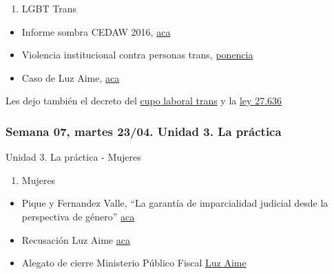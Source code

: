\documentclass[
]{article}
\providecommand{\tightlist}{%
  \setlength{\itemsep}{0pt}\setlength{\parskip}{0pt}}
\begin{document}
\begin{enumerate}
\def\labelenumi{\alph{enumi}.}
\setcounter{enumi}{3}
\tightlist
\item
  LGBT Trans
\end{enumerate}

\begin{itemize}
\item
  Informe sombra CEDAW 2016,
  \href{https://drive.google.com/file/d/1Zv0TtTTzgt5N4vSBEo3F7UjiayBQ2BIx/view?usp=sharing}{aca}
\item
  Violencia institucional contra personas trans,
  \href{https://drive.google.com/file/d/1NWDuVTHVpSSWbHTuvP6WPAy6waXvDyXo/view}{ponencia}
\item
  Caso de Luz Aime,
  \href{http://cosecharoja.org/absolvieron-a-luz-aime/}{aca}
\end{itemize}

Les dejo también el decreto del
\href{http://servicios.infoleg.gob.ar/infolegInternet/anexos/340000-344999/341808/norma.htm}{cupo
laboral trans} y la
\href{http://servicios.infoleg.gob.ar/infolegInternet/anexos/350000-354999/351815/norma.htm}{ley
27.636}

\hypertarget{semana-07-martes-2304.-unidad-3.-la-pruxe1ctica}{%
\subsubsection{Semana 07, martes 23/04. Unidad 3. La
práctica}\label{semana-07-martes-2304.-unidad-3.-la-pruxe1ctica}}

Unidad 3. La práctica - Mujeres

\begin{enumerate}
\def\labelenumi{\alph{enumi}.}
\setcounter{enumi}{4}
\tightlist
\item
  Mujeres
\end{enumerate}

\begin{itemize}
\item
  Pique y Fernandez Valle, ``La garantía de imparcialidad judicial desde
  la perspectiva de género''
  \href{https://drive.google.com/file/d/1atsNG8fNfxcBruDPtPve0N3AmUf6OA3h/view?usp=sharing}{aca}
\item
  Recusación Luz Aime
  \href{https://drive.google.com/file/d/1ZWe1xva3x_Y0ttVg2CZ4eliKBj-8bbBy/preview}{aca}
\item
  Alegato de cierre Ministerio Público Fiscal
  \href{https://youtu.be/ZKH82JYVLgc}{Luz Aime}
\end{itemize}
\end{document}
